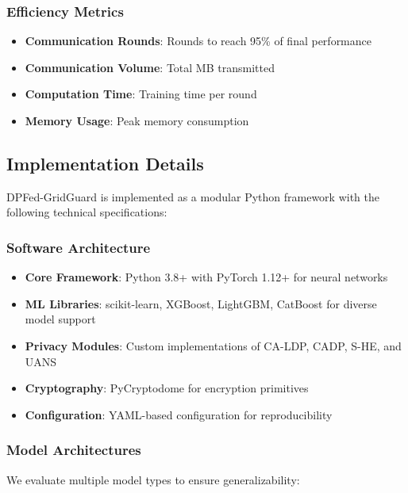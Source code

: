 \documentclass{ieeeaccess}
\theoremstyle{definition}
\begin{document}
\subsubsection{Efficiency Metrics}
\begin{itemize}
\item \textbf{Communication Rounds}: Rounds to reach 95\% of final performance
\item \textbf{Communication Volume}: Total MB transmitted
\item \textbf{Computation Time}: Training time per round
\item \textbf{Memory Usage}: Peak memory consumption
\end{itemize}

\subsection{Implementation Details}

DPFed-GridGuard is implemented as a modular Python framework with the following technical specifications:

\subsubsection{Software Architecture}
\begin{itemize}
\item \textbf{Core Framework}: Python 3.8+ with PyTorch 1.12+ for neural networks
\item \textbf{ML Libraries}: scikit-learn, XGBoost, LightGBM, CatBoost for diverse model support
\item \textbf{Privacy Modules}: Custom implementations of CA-LDP, CADP, S-HE, and UANS
\item \textbf{Cryptography}: PyCryptodome for encryption primitives
\item \textbf{Configuration}: YAML-based configuration for reproducibility
\end{itemize}

\subsubsection{Model Architectures}

We evaluate multiple model types to ensure generalizability:
\end{document}
